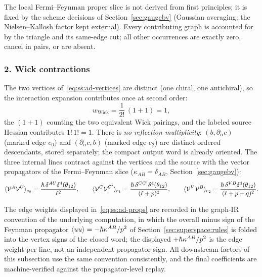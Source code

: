 \begin{remark}\label{rem:ss:ad-census}
The local Fermi--Feynman proper slice is not derived from first principles; it
is fixed by the scheme decisions of Section~\ref{sec:gaugebv} (Gaussian
averaging; the Nielsen--Kallosh factor kept external). Every contributing
graph is accounted for by the triangle and its same-edge cut; all other
occurrences are exactly zero, cancel in pairs, or are absent.
\end{remark}

\subsubsection*{2. Wick contractions}

The two vertices of~\eqref{eq:ss:ad-vertices} are distinct (one chiral, one
antichiral), so the interaction expansion contributes once at second order:
\begin{equation}\label{eq:ss:ad-wick}
w_{\mathrm{Wick}}=\frac{1}{2!}\,(1+1)=1,
\end{equation}
the $(1+1)$ counting the two equivalent Wick pairings, and the labeled source
Hessian contributes $1!\,1!=1$. There is \emph{no reflection multiplicity}:
$(b,\partial_{\dot\alpha}c)$ (marked edge $e_{0}$) and
$(\partial_{\dot\alpha}c,b)$ (marked edge $e_{2}$) are distinct ordered
descendants, stored separately; the compact output word is already oriented.
The three internal lines contract against the vertices and the source with the
vector propagators of the Fermi--Feynman slice ($\kappa_{AB}=\delta_{AB}$,
Section~\ref{sec:gaugebv}):
\begin{equation}\label{eq:ss:ad-props}
\langle\mathcal{V}^{A}\mathcal{V}^{U}\rangle_{e_{0}}
=\frac{\hbar\,\delta^{AU}\delta^{4}(\theta_{12})}{\ell^{2}},
\qquad
\langle\mathcal{V}^{C}\mathcal{V}^{C'}\rangle_{e_{1}}
=\frac{\hbar\,\delta^{CC'}\delta^{4}(\theta_{12})}{(\ell+p)^{2}},
\qquad
\langle\mathcal{V}^{V}\mathcal{V}^{B}\rangle_{e_{2}}
=\frac{\hbar\,\delta^{VB}\delta^{4}(\theta_{12})}{(\ell+p+q)^{2}} .
\end{equation}
\begin{remark}\label{rem:ss:ad-edgesign}
The edge weights displayed in~\eqref{eq:ss:ad-props} are recorded in the
graph-IR convention of the underlying computation, in which the overall
minus sign of the Feynman propagator $\langle uu\rangle=-\hbar\kappa^{AB}/p^{2}$
of Section~\ref{sec:superspace:rules} is folded into the vertex signs of the
closed word; the displayed $+\hbar\kappa^{AB}/p^{2}$ is the edge weight per
line, not an independent propagator sign. All downstream factors of this
subsection use the same convention consistently, and the final coefficients
are machine-verified against the propagator-level replay.
\end{remark}
